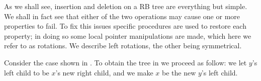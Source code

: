 \documentclass{subfiles}
\begin{document}
    As we shall see, insertion and deletion on a RB tree are everything but simple. 
        We shall in fact see that either of the two operations
        may cause one or more properties to fail.
        To fix this issues specific procedures are used to restore each property;
        in doing so some local pointer manipulations are made,
        which here we refer to as rotations.
        We describe left rotations, the other being symmetrical.

    
    Consider the case shown in .
        To obtain the tree in  we proceed as follow:
        we let \(y\)'s left child to be \(x\)'s new right child,
        and we make \(x\) be the new \(y\)'s left child.
\end{document}
